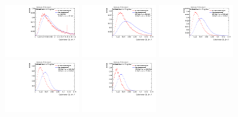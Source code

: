 \begin{figure}
\includegraphics[width=0.3\textwidth]{sascha_input/Appendix/Distributions/higgs/distributions/beta17/h_recoJet_C2_17_bin1.pdf} \hspace{1mm}
\includegraphics[width=0.3\textwidth]{sascha_input/Appendix/Distributions/higgs/distributions/beta17/h_recoJet_C2_17_bin2.pdf} \hspace{4mm}
\includegraphics[width=0.3\textwidth]{sascha_input/Appendix/Distributions/higgs/distributions/beta17/h_recoJet_C2_17_bin3.pdf} 
\bigskip
\includegraphics[width=0.3\textwidth]{sascha_input/Appendix/Distributions/higgs/distributions/beta17/h_recoJet_C2_17_bin4.pdf} \hspace{4mm}
\includegraphics[width=0.3\textwidth]{sascha_input/Appendix/Distributions/higgs/distributions/beta17/h_recoJet_C2_17_bin5.pdf} 


\end{figure}
